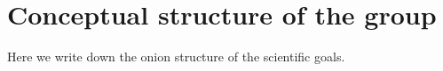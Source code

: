 \section*{Conceptual structure of the group}

Here we write down the onion structure of the scientific goals. 